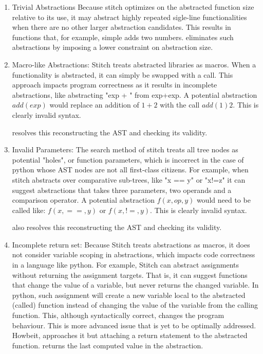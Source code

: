 \begin{enumerate}
    \item Trivial Abstractions
    Because stitch optimizes on the abstracted function size relative to its use, it may abstract highly repeated sigle-line functionalities when there are no other larger abstraction candidates. This results in functions that, for example, simple adds two numbers. \toolname eliminates such abstractions by imposing a lower constraint on abstraction size.
    \item Macro-like Abstractions: 
    Stitch treats abstracted libraries as macros. When a functionality is abstracted, it can simply be swapped with a call. This approach impacts program correctness as it results in incomplete abstractions, like abstracting "exp + " from exp+exp. A potential abstraction $add(exp)$ would replace an addition of $1+2$ with the call $add(1) 2$. This is clearly invalid syntax.
    
    \toolname resolves this reconstructing the AST and checking its validity. 
    \item Invalid Parameters:
    The search method of stitch treats all tree nodes as potential "holes", or function parameters, which is incorrect in the case of python whose AST nodes are not all first-class citizens. For example, when stitch abstracts over comparative sub-trees, like "x == y" or "x!=z" it can suggest abstractions that takes three parameters, two operands and a comparison operator. A potential abstraction $f(x,op,y)$ would need to be called like: $f(x, ==, y)$ or $f(x, !=, y)$. This is clearly invalid syntax.
    
    \toolname also resolves this reconstructing the AST and checking its validity. 
    \item Incomplete return set:
    Because Stitch treats abstractions as macros, it does not consider variable scoping in abstractions, which impacts code correctness in a language like python. For example, Stitch can abstract assignments without returning the assignment targets. That is, it can suggest functions that change the value of a variable, but never returns the changed variable. In python, such assignment will create a new variable local to the abstracted (called) function instead of changing the value of the variable from the calling function. This, although syntactically correct, changes the program behaviour. This is more advanced issue that is yet to be optimally addressed. Howbeit, \toolname approaches it but attaching a return statement to the abstracted function. \toolname returns the last computed value in the abstraction.
    
\end{enumerate}

